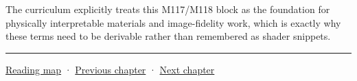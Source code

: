 The curriculum explicitly treats this M117/M118 block as the foundation for physically interpretable materials and image-fidelity work, which is exactly why these terms need to be derivable rather than remembered as shader snippets.

\begin{center}\rule{0.5\linewidth}{0.5pt}\end{center}

\hyperref[volume-reading-map]{Reading map} · \hyperref[03-visual-computing-i-ch004-sampling-filtering-and-reconstruction]{Previous chapter} · \hyperref[03-visual-computing-i-ch006-from-material-data-to-gpu-bindings]{Next chapter}
